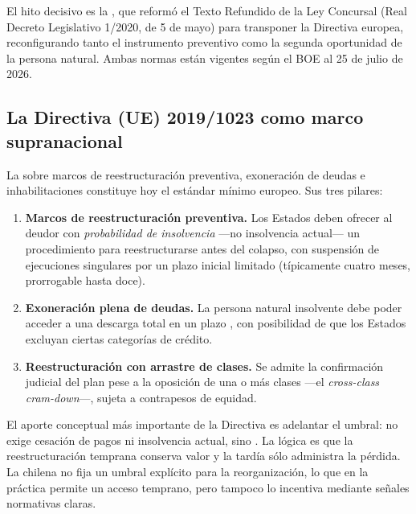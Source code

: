 El hito decisivo es la  \parencite{esp-ley16-2022}, que
reformó el Texto Refundido de la Ley Concursal (Real Decreto Legislativo 1/2020, de 5 de mayo) para
transponer la Directiva europea, reconfigurando tanto el instrumento preventivo como la segunda
oportunidad de la persona natural. Ambas normas están vigentes según el BOE al 25 de julio de 2026.

\subsection{La Directiva (UE) 2019/1023 como marco supranacional}

La  \parencite{ue-directiva-2019-1023} sobre marcos de
reestructuración preventiva, exoneración de deudas e inhabilitaciones constituye hoy el estándar
mínimo europeo. Sus tres pilares:

\begin{enumerate}
  \item \textbf{Marcos de reestructuración preventiva.} Los Estados deben ofrecer al deudor con
  \emph{probabilidad de insolvencia} ---no insolvencia actual--- un procedimiento para
  reestructurarse antes del colapso, con suspensión de ejecuciones singulares por un plazo inicial
  limitado (típicamente cuatro meses, prorrogable hasta doce).

  \item \textbf{Exoneración plena de deudas.} La persona natural insolvente debe poder acceder a
  una descarga total en un plazo , con posibilidad de que los
  Estados excluyan ciertas categorías de crédito.

  \item \textbf{Reestructuración con arrastre de clases.} Se admite la confirmación judicial del
  plan pese a la oposición de una o más clases ---el \emph{cross-class cram-down}---, sujeta a
  contrapesos de equidad.
\end{enumerate}

\begin{foco}
El aporte conceptual más importante de la Directiva es adelantar el umbral: no exige cesación de
pagos ni insolvencia actual, sino . La lógica es que la
reestructuración temprana conserva valor y la tardía sólo administra la pérdida. La \LIR{} chilena
no fija un umbral explícito para la reorganización, lo que en la práctica permite un acceso
temprano, pero tampoco lo incentiva mediante señales normativas claras.
\end{foco}


